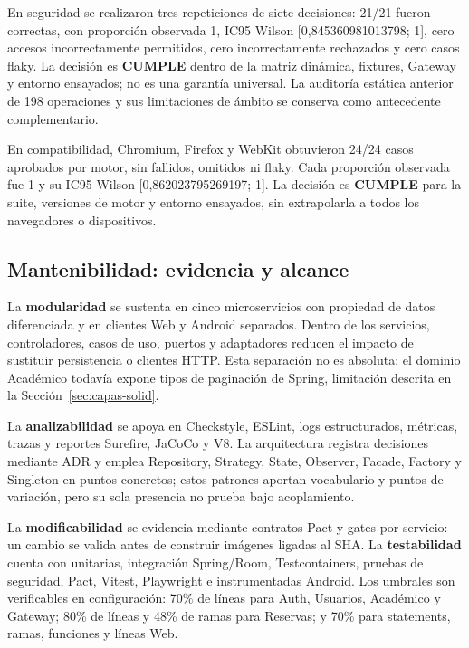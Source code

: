 En seguridad se realizaron tres repeticiones de siete decisiones: 21/21 fueron
correctas, con proporción observada 1, IC95 Wilson
[0,845360981013798; 1], cero accesos incorrectamente permitidos, cero
incorrectamente rechazados y cero casos flaky. La decisión es \textbf{CUMPLE}
dentro de la matriz dinámica, fixtures, Gateway y entorno ensayados; no es una
garantía universal. La auditoría estática anterior de 198 operaciones y sus
limitaciones de ámbito se conserva como antecedente complementario.

En compatibilidad, Chromium, Firefox y WebKit obtuvieron 24/24 casos aprobados
por motor, sin fallidos, omitidos ni flaky. Cada proporción observada fue 1 y su
IC95 Wilson [0,862023795269197; 1]. La decisión es \textbf{CUMPLE} para la
suite, versiones de motor y entorno ensayados, sin extrapolarla a todos los
navegadores o dispositivos.

\subsection{Mantenibilidad: evidencia y alcance}
\label{subsec:mantenibilidad}

La \textbf{modularidad} se sustenta en cinco microservicios con propiedad de
datos diferenciada y en clientes Web y Android separados. Dentro de los
servicios, controladores, casos de uso, puertos y adaptadores reducen el impacto
de sustituir persistencia o clientes HTTP. Esta separación no es absoluta: el
dominio Académico todavía expone tipos de paginación de Spring, limitación
descrita en la Sección~\ref{sec:capas-solid}.

La \textbf{analizabilidad} se apoya en Checkstyle, ESLint, logs estructurados,
métricas, trazas y reportes Surefire, JaCoCo y V8. La arquitectura registra
decisiones mediante ADR y emplea Repository, Strategy, State, Observer, Facade,
Factory y Singleton en puntos concretos; estos patrones aportan vocabulario y
puntos de variación, pero su sola presencia no prueba bajo acoplamiento.

La \textbf{modificabilidad} se evidencia mediante contratos Pact y gates por
servicio: un cambio se valida antes de construir imágenes ligadas al SHA. La
\textbf{testabilidad} cuenta con unitarias, integración Spring/Room,
Testcontainers, pruebas de seguridad, Pact, Vitest, Playwright e instrumentadas
Android. Los umbrales son verificables en configuración: 70\% de líneas para
Auth, Usuarios, Académico y Gateway; 80\% de líneas y 48\% de ramas para
Reservas; y 70\% para statements, ramas, funciones y líneas Web.

